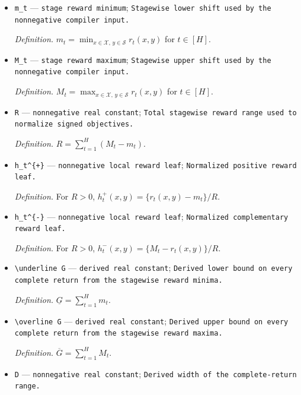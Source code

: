 \documentclass{article}
\begin{document}
\begin{itemize}
  \par\smallskip\noindent\emph{Definition.} \(r=(r_t(x,y):t\in[H],x\in\mathcal X,y\in\mathcal S)\).
  \item \texttt{m\_\allowbreak{}t} --- \texttt{stage reward minimum}; \texttt{Stagewise lower shift used by the nonnegative compiler input.}
  \par\smallskip\noindent\emph{Definition.} \(m_t=\min_{x\in\mathcal X,\,y\in\mathcal S}r_t(x,y)\) for \(t\in[H]\).
  \item \texttt{M\_\allowbreak{}t} --- \texttt{stage reward maximum}; \texttt{Stagewise upper shift used by the nonnegative compiler input.}
  \par\smallskip\noindent\emph{Definition.} \(M_t=\max_{x\in\mathcal X,\,y\in\mathcal S}r_t(x,y)\) for \(t\in[H]\).
  \item \texttt{R} --- \texttt{nonnegative real constant}; \texttt{Total stagewise reward range used to normalize signed objectives.}
  \par\smallskip\noindent\emph{Definition.} \(R=\sum_{t=1}^H(M_t-m_t)\).
  \item \texttt{h\_\allowbreak{}t\textasciicircum{}\{+\allowbreak{}\}\allowbreak{}} --- \texttt{nonnegative local reward leaf}; \texttt{Normalized positive reward leaf.}
  \par\smallskip\noindent\emph{Definition.} For \(R>0\), \(h_t^{+}(x,y)=\{r_t(x,y)-m_t\}/R\).
  \item \texttt{h\_\allowbreak{}t\textasciicircum{}\{-\allowbreak{}\}\allowbreak{}} --- \texttt{nonnegative local reward leaf}; \texttt{Normalized complementary reward leaf.}
  \par\smallskip\noindent\emph{Definition.} For \(R>0\), \(h_t^{-}(x,y)=\{M_t-r_t(x,y)\}/R\).
  \item \texttt{\textbackslash{}\allowbreak{}underline G} --- \texttt{derived real constant}; \texttt{Derived lower bound on every complete return from the stagewise reward minima.}
  \par\smallskip\noindent\emph{Definition.} \(\underline G=\sum_{t=1}^H m_t\).
  \item \texttt{\textbackslash{}\allowbreak{}overline G} --- \texttt{derived real constant}; \texttt{Derived upper bound on every complete return from the stagewise reward maxima.}
  \par\smallskip\noindent\emph{Definition.} \(\overline G=\sum_{t=1}^H M_t\).
  \item \texttt{D} --- \texttt{nonnegative real constant}; \texttt{Derived width of the complete-\allowbreak{}return range.}

\end{itemize}
\end{document}
